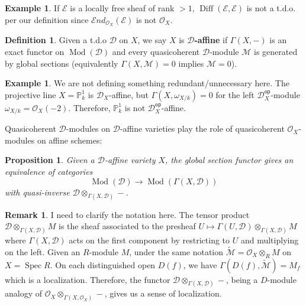 \documentclass[11pt, a4paper]{article}
\newtheorem{proposition}[theorem]{Proposition}
\theoremstyle{definition}
\newtheorem{remark}[theorem]{Remark}
\newtheorem{example}[theorem]{Example}
\newtheorem{definition}[theorem]{Definition}
\newcommand{\w}[0]{\omega}
\newcommand{\Spec}[0]{\operatorname{Spec}}
\newcommand{\op}[0]{\mathsf{op}}
\newcommand{\Mod}{\operatorname{Mod}}
\newcommand{\Diff}{\operatorname{Diff}}
\begin{document}
    \begin{example}
        If $\mathcal E$ is a locally free sheaf of rank $>1$, $\Diff(\mathcal E,\mathcal E)$ is not a t.d.o. per our definition since $\mathcal End_{\mathcal O_X}(\mathcal E)$ is not $\mathcal O_X$.
    \end{example}
    \begin{definition}
        Given a t.d.o $\mathcal D$ on $X$, we say $X$ is \textbf{$\mathcal D$-affine} if $\Gamma(X, -)$ is an exact functor on $\Mod(\mathcal D)$ and every quasicoherent $\mathcal D$-module $\mathcal M$ is generated by global sections (equivalently $\Gamma(X, \mathcal M)=0$ implies $\mathcal M=0$).
    \end{definition}
    \begin{example}
        We are not defining something redundant/unnecessary here. The projective line $X=\mathbb P^1_k$ is $\mathcal D_X$-affine, but $\Gamma(X,\w_{X/k})=0$ for the left $\mathcal D_X^\op$-module $\w_{X/k}=\mathcal O_{X}(-2)$. Therefore, $\mathbb P^1_k$ is not $\mathcal D_X^\op$-affine.
    \end{example}
    Quasicoherent $\mathcal D$-modules on $\mathcal D$-affine varieties play the role of quasicoherent $\mathcal O_X$-modules on affine schemes:
    \begin{proposition}\label{prop-d-affinity}
        Given a $\mathcal D$-affine variety $X$, the global section functor gives an equivalence of categories 
        \[\Mod(\mathcal D)\to\Mod(\Gamma(X, \mathcal D))\]
        with quasi-inverse $\mathcal D\otimes_{\Gamma(X, \mathcal D)}-$.
    \end{proposition}
    \begin{remark}
        I need to clarify the notation here. The tensor product $\mathcal D\otimes_{\Gamma(X, \mathcal D)}M$ is the sheaf associated to the presheaf $U\mapsto \Gamma(U, \mathcal D)\otimes_{\Gamma(X,\mathcal D)}M$ where $\Gamma(X,\mathcal D)$ acts on the first component by restricting to $U$ and multiplying on the left. Given an $R$-module $M$, under the same notation $\widetilde{\mathcal M}=\mathcal O_X\otimes_RM$ on $X=\Spec R$. On each distinguished open $D(f)$, we have $\Gamma(D(f), \widetilde{\mathcal M})=M_f$ which is a localization. Therefore, the functor $\mathcal D\otimes_{\Gamma(X, \mathcal D)}-$, being a $D$-module analogy of $\mathcal O_X\otimes_{\Gamma(X, \mathcal O_X)}-$, gives us a sense of localization.
    \end{remark}
\end{document}
